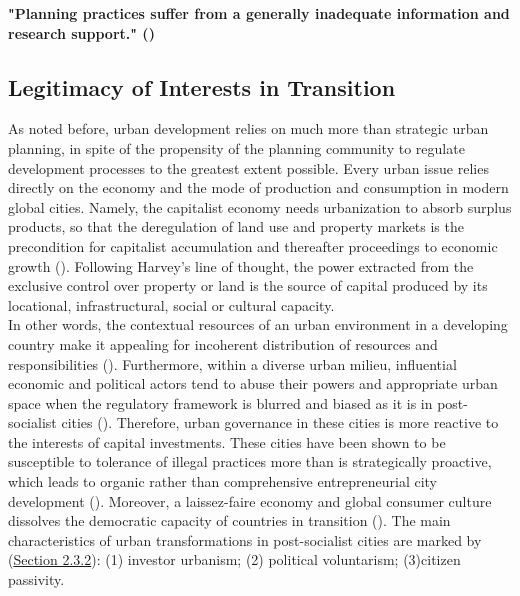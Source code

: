 \documentclass[11pt]{report}
\begin{document}
\textbf{"Planning practices suffer from a generally inadequate information and research support." (\href{Vujosevic}{\citealt{vujosevic_novi_2012}})}

\subsection{Legitimacy of Interests in Transition}

As noted before, urban development relies on much more than strategic urban planning, in spite of the propensity of the planning community to regulate development processes to the greatest extent possible. Every urban issue relies directly on the economy and the mode of production and consumption in modern global cities. Namely, the capitalist economy needs urbanization to absorb surplus products, so that the deregulation of land use and property markets is the precondition for capitalist accumulation and thereafter proceedings to economic growth (\href{Harvey}{\citealt{harvey_rebel_2012}}). Following Harvey’s line of thought, the power extracted from the exclusive control over property or land is the source of capital produced by its locational, infrastructural, social or cultural capacity.
\\
In other words, the contextual resources of an urban environment in a developing country make it appealing for incoherent distribution of resources and responsibilities (\href{Bolay}{\citealt{bolay_urban_2005}}). Furthermore, within a diverse urban milieu, influential economic and political actors tend to abuse their powers and appropriate urban space when the regulatory framework is blurred and biased as it is in post-socialist cities (\href{Djokic}{\citealt{djokic_political_2007}}). 
Therefore, urban governance in these cities is more reactive to the interests of capital investments. These cities have been shown to be susceptible to tolerance of illegal practices more than is strategically proactive, which leads to organic rather than comprehensive entrepreneurial city development (\href{Petrovic}{\citealt{petrovic_cities_2009}}).
Moreover, a laissez-faire economy and global consumer culture  dissolves the democratic capacity of countries in transition (\href{Ellin}{\citealt{ellin_postmodern_1999}}). The main characteristics of urban transformations in post-socialist cities are marked by (\href{Section 2.3.2}{Section 2.3.2}):
(1) investor urbanism;
(2) political voluntarism;
(3)citizen passivity.
\\
\end{document}
